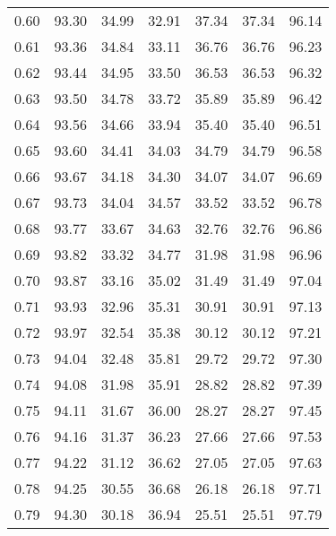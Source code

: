 \begin{tabular}{|c|c|c|c|c|c|c|}
      0.60 &     93.30 &     34.99 &      32.91 &   37.34 &      37.34 &         96.14 \\
      0.61 &     93.36 &     34.84 &      33.11 &   36.76 &      36.76 &         96.23 \\
      0.62 &     93.44 &     34.95 &      33.50 &   36.53 &      36.53 &         96.32 \\
      0.63 &     93.50 &     34.78 &      33.72 &   35.89 &      35.89 &         96.42 \\
      0.64 &     93.56 &     34.66 &      33.94 &   35.40 &      35.40 &         96.51 \\
      0.65 &     93.60 &     34.41 &      34.03 &   34.79 &      34.79 &         96.58 \\
      0.66 &     93.67 &     34.18 &      34.30 &   34.07 &      34.07 &         96.69 \\
      0.67 &     93.73 &     34.04 &      34.57 &   33.52 &      33.52 &         96.78 \\
      0.68 &     93.77 &     33.67 &      34.63 &   32.76 &      32.76 &         96.86 \\
      0.69 &     93.82 &     33.32 &      34.77 &   31.98 &      31.98 &         96.96 \\
      0.70 &     93.87 &     33.16 &      35.02 &   31.49 &      31.49 &         97.04 \\
      0.71 &     93.93 &     32.96 &      35.31 &   30.91 &      30.91 &         97.13 \\
      0.72 &     93.97 &     32.54 &      35.38 &   30.12 &      30.12 &         97.21 \\
      0.73 &     94.04 &     32.48 &      35.81 &   29.72 &      29.72 &         97.30 \\
      0.74 &     94.08 &     31.98 &      35.91 &   28.82 &      28.82 &         97.39 \\
      0.75 &     94.11 &     31.67 &      36.00 &   28.27 &      28.27 &         97.45 \\
      0.76 &     94.16 &     31.37 &      36.23 &   27.66 &      27.66 &         97.53 \\
      0.77 &     94.22 &     31.12 &      36.62 &   27.05 &      27.05 &         97.63 \\
      0.78 &     94.25 &     30.55 &      36.68 &   26.18 &      26.18 &         97.71 \\
      0.79 &     94.30 &     30.18 &      36.94 &   25.51 &      25.51 &         97.79 \\

\end{tabular}
